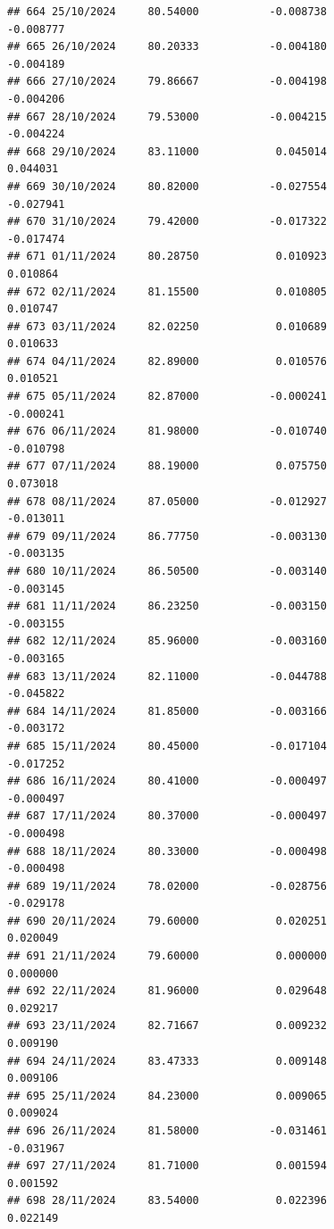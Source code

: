 \documentclass[
]{article}
\begin{document}
\begin{verbatim}
## 664 25/10/2024     80.54000           -0.008738               -0.008777
## 665 26/10/2024     80.20333           -0.004180               -0.004189
## 666 27/10/2024     79.86667           -0.004198               -0.004206
## 667 28/10/2024     79.53000           -0.004215               -0.004224
## 668 29/10/2024     83.11000            0.045014                0.044031
## 669 30/10/2024     80.82000           -0.027554               -0.027941
## 670 31/10/2024     79.42000           -0.017322               -0.017474
## 671 01/11/2024     80.28750            0.010923                0.010864
## 672 02/11/2024     81.15500            0.010805                0.010747
## 673 03/11/2024     82.02250            0.010689                0.010633
## 674 04/11/2024     82.89000            0.010576                0.010521
## 675 05/11/2024     82.87000           -0.000241               -0.000241
## 676 06/11/2024     81.98000           -0.010740               -0.010798
## 677 07/11/2024     88.19000            0.075750                0.073018
## 678 08/11/2024     87.05000           -0.012927               -0.013011
## 679 09/11/2024     86.77750           -0.003130               -0.003135
## 680 10/11/2024     86.50500           -0.003140               -0.003145
## 681 11/11/2024     86.23250           -0.003150               -0.003155
## 682 12/11/2024     85.96000           -0.003160               -0.003165
## 683 13/11/2024     82.11000           -0.044788               -0.045822
## 684 14/11/2024     81.85000           -0.003166               -0.003172
## 685 15/11/2024     80.45000           -0.017104               -0.017252
## 686 16/11/2024     80.41000           -0.000497               -0.000497
## 687 17/11/2024     80.37000           -0.000497               -0.000498
## 688 18/11/2024     80.33000           -0.000498               -0.000498
## 689 19/11/2024     78.02000           -0.028756               -0.029178
## 690 20/11/2024     79.60000            0.020251                0.020049
## 691 21/11/2024     79.60000            0.000000                0.000000
## 692 22/11/2024     81.96000            0.029648                0.029217
## 693 23/11/2024     82.71667            0.009232                0.009190
## 694 24/11/2024     83.47333            0.009148                0.009106
## 695 25/11/2024     84.23000            0.009065                0.009024
## 696 26/11/2024     81.58000           -0.031461               -0.031967
## 697 27/11/2024     81.71000            0.001594                0.001592
## 698 28/11/2024     83.54000            0.022396                0.022149

\end{verbatim}
\end{document}

